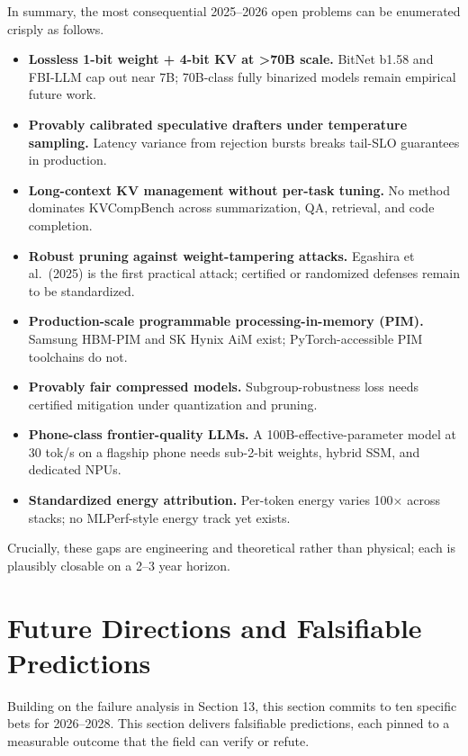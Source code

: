 \documentclass{article}
\begin{document}
In summary, the most consequential 2025--2026 open problems can be enumerated crisply as follows.

\begin{itemize}

\item
  \textbf{Lossless 1-bit weight + 4-bit KV at \textgreater70B scale.} BitNet b1.58 and FBI-LLM cap out near 7B; 70B-class fully binarized models remain empirical future work.
\item
  \textbf{Provably calibrated speculative drafters under temperature sampling.} Latency variance from rejection bursts breaks tail-SLO guarantees in production.
\item
  \textbf{Long-context KV management without per-task tuning.} No method dominates KVCompBench across summarization, QA, retrieval, and code completion.
\item
  \textbf{Robust pruning against weight-tampering attacks.} Egashira et al.~(2025) is the first practical attack; certified or randomized defenses remain to be standardized.
\item
  \textbf{Production-scale programmable processing-in-memory (PIM).} Samsung HBM-PIM and SK Hynix AiM exist; PyTorch-accessible PIM toolchains do not.
\item
  \textbf{Provably fair compressed models.} Subgroup-robustness loss \citep{gee2024arecompressedlangu} needs certified mitigation under quantization and pruning.
\item
  \textbf{Phone-class frontier-quality LLMs.} A 100B-effective-parameter model at 30 tok/s on a flagship phone needs sub-2-bit weights, hybrid SSM, and dedicated NPUs.
\item
  \textbf{Standardized energy attribution.} Per-token energy varies 100× across stacks; no MLPerf-style energy track yet exists.
\end{itemize}

Crucially, these gaps are engineering and theoretical rather than physical; each is plausibly closable on a 2--3 year horizon.

\section{Future Directions and Falsifiable Predictions}\label{future-directions-and-falsifiable-predictions}

Building on the failure analysis in Section 13, this section commits to ten specific bets for 2026--2028. This section delivers falsifiable predictions, each pinned to a measurable outcome that the field can verify or refute.
\end{document}
